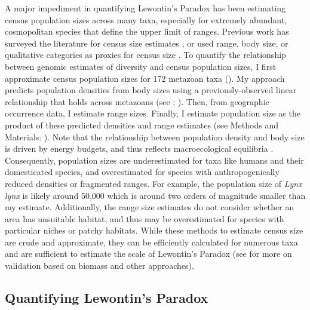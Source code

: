 \documentclass[9pt,lineno]{elife}
\begin{document}
A major impediment in quantifying Lewontin's Paradox has been estimating census
population sizes across many taxa, especially for extremely abundant,
cosmopolitan species that define the upper limit of ranges. Previous work has
surveyed the literature for census size estimates
\citep{Nei1984-zi,Soule1976-he,Frankham1996-yb}, or used range, body size, or
qualitative categories as proxies for census size
\citep{Corbett-Detig2015-gt,Leffler2012-zj}. To quantify the relationship
between genomic estimates of diversity and census population sizes, I first
approximate census population sizes for 172 metazoan taxa (). My
approach predicts population densities from body sizes using a
previously-observed linear relationship that holds across metazoans (see
; \cite{Damuth1981-st,Damuth1987-sg}). Then, from
geographic occurrence data, I estimate range sizes.  Finally, I estimate
population size as the product of these predicted densities and range estimates
(see Methods and Materials: ). Note that the relationship between
population density and body size is driven by energy budgets, and thus reflects
macroecological equilibria \citep{Damuth1987-sg}. Consequently, population
sizes are underestimated for taxa like humans and their domesticated species,
and overestimated for species with anthropogenically reduced densities or
fragmented ranges. For example, the population size of \emph{Lynx lynx} is
likely around 50,000 \citep{Iucn2020-ap} which is around two orders of
magnitude smaller than my estimate. Additionally, the range size estimates do
not consider whether an area has unsuitable habitat, and thus may be
overestimated for species with particular niches or patchy habitats. While
these methods to estimate census size are crude and approximate, they can be
efficiently calculated for numerous taxa and are sufficient to estimate the
scale of Lewontin's Paradox (see  for more on
validation based on biomass and other approaches). 

\subsection{Quantifying Lewontin's Paradox}
\end{document}
